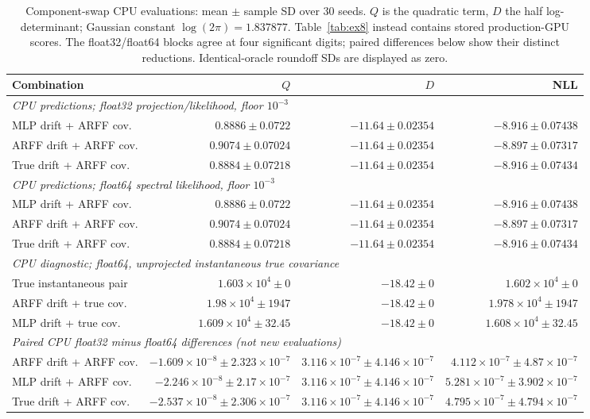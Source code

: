 \begin{table}[ht]\centering\scriptsize\caption{Component-swap CPU evaluations: mean $\pm$ sample SD over 30 seeds. $Q$ is the quadratic term, $D$ the half log-determinant; Gaussian constant $\log(2\pi)=1.837877$. Table~\ref{tab:ex8} instead contains stored production-GPU scores. The float32/float64 blocks agree at four significant digits; paired differences below show their distinct reductions. Identical-oracle roundoff SDs are displayed as zero.}\label{tab:swaps}\begin{tabular}{lrrr}\toprule Combination & $Q$ & $D$ & NLL\\\midrule
\multicolumn{4}{l}{\emph{CPU predictions; float32 projection/likelihood, floor $10^{-3}$}}\\
MLP drift + ARFF cov. & $0.8886\pm 0.0722$ & $-11.64\pm 0.02354$ & $-8.916\pm 0.07438$\\
ARFF drift + ARFF cov. & $0.9074\pm 0.07024$ & $-11.64\pm 0.02354$ & $-8.897\pm 0.07317$\\
True drift + ARFF cov. & $0.8884\pm 0.07218$ & $-11.64\pm 0.02354$ & $-8.916\pm 0.07434$\\
\multicolumn{4}{l}{\emph{CPU predictions; float64 spectral likelihood, floor $10^{-3}$}}\\
MLP drift + ARFF cov. & $0.8886\pm 0.0722$ & $-11.64\pm 0.02354$ & $-8.916\pm 0.07438$\\
ARFF drift + ARFF cov. & $0.9074\pm 0.07024$ & $-11.64\pm 0.02354$ & $-8.897\pm 0.07317$\\
True drift + ARFF cov. & $0.8884\pm 0.07218$ & $-11.64\pm 0.02354$ & $-8.916\pm 0.07434$\\
\multicolumn{4}{l}{\emph{CPU diagnostic; float64, unprojected instantaneous true covariance}}\\
True instantaneous pair & $1.603\times10^{4}\pm 0$ & $-18.42\pm 0$ & $1.602\times10^{4}\pm 0$\\
ARFF drift + true cov. & $1.98\times10^{4}\pm 1947$ & $-18.42\pm 0$ & $1.978\times10^{4}\pm 1947$\\
MLP drift + true cov. & $1.609\times10^{4}\pm 32.45$ & $-18.42\pm 0$ & $1.608\times10^{4}\pm 32.45$\\
\midrule\multicolumn{4}{l}{\emph{Paired CPU float32 minus float64 differences (not new evaluations)}}\\
ARFF drift + ARFF cov. & $-1.609\times10^{-8}\pm 2.323\times10^{-7}$ & $3.116\times10^{-7}\pm 4.146\times10^{-7}$ & $4.112\times10^{-7}\pm 4.87\times10^{-7}$\\
MLP drift + ARFF cov. & $-2.246\times10^{-8}\pm 2.17\times10^{-7}$ & $3.116\times10^{-7}\pm 4.146\times10^{-7}$ & $5.281\times10^{-7}\pm 3.902\times10^{-7}$\\
True drift + ARFF cov. & $-2.537\times10^{-8}\pm 2.306\times10^{-7}$ & $3.116\times10^{-7}\pm 4.146\times10^{-7}$ & $4.795\times10^{-7}\pm 4.794\times10^{-7}$\\
\bottomrule\end{tabular}\end{table}
